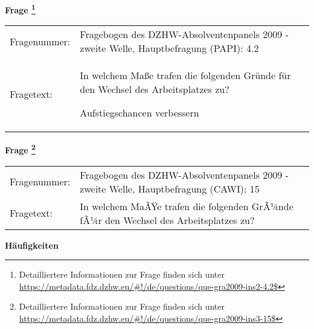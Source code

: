 				\vspace*{0.5cm}
                \noindent\textbf{Frage
	                \footnote{Detailliertere Informationen zur Frage finden sich unter
		              \url{https://metadata.fdz.dzhw.eu/\#!/de/questions/que-gra2009-ins2-4.2$}}}\\
				\begin{tabularx}{\hsize}{@{}lX}
					Fragenummer: &
					  Fragebogen des DZHW-Absolventenpanels 2009 - zweite Welle, Hauptbefragung (PAPI):
					  4.2
 \\
					Fragetext: & In welchem Maße trafen die folgenden Gründe für den Wechsel des Arbeitsplatzes zu?\par  Aufstiegschancen verbessern \\
				\end{tabularx}
				\vspace*{0.5cm}
                \noindent\textbf{Frage
	                \footnote{Detailliertere Informationen zur Frage finden sich unter
		              \url{https://metadata.fdz.dzhw.eu/\#!/de/questions/que-gra2009-ins3-15$}}}\\
				\begin{tabularx}{\hsize}{@{}lX}
					Fragenummer: &
					  Fragebogen des DZHW-Absolventenpanels 2009 - zweite Welle, Hauptbefragung (CAWI):
					  15
 \\
					Fragetext: & In welchem MaÃŸe trafen die folgenden GrÃ¼nde fÃ¼r den Wechsel des Arbeitsplatzes zu? \\
				\end{tabularx}





        		\vspace*{0.5cm}
                \noindent\textbf{Häufigkeiten}

